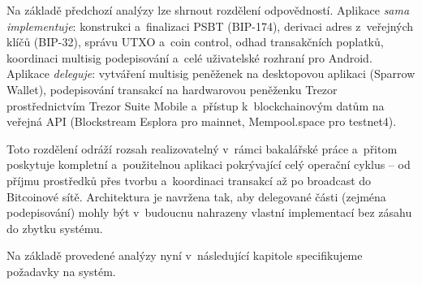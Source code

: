 Na základě předchozí analýzy lze shrnout rozdělení odpovědností.
Aplikace \emph{sama implementuje}: konstrukci a~finalizaci PSBT
(BIP-174), derivaci adres z~veřejných klíčů (BIP-32), správu UTXO
a~coin control, odhad transakčních poplatků, koordinaci multisig
podepisování a~celé uživatelské rozhraní pro Android.
Aplikace \emph{deleguje}: vytváření multisig peněženek na desktopovou
aplikaci (Sparrow Wallet), podepisování transakcí na hardwarovou
peněženku Trezor prostřednictvím Trezor Suite Mobile a~přístup
k~blockchainovým datům na veřejná API (Blockstream Esplora
pro mainnet, Mempool.space pro testnet4).

Toto rozdělení odráží rozsah realizovatelný v~rámci bakalářské práce
a~přitom poskytuje kompletní a~použitelnou aplikaci pokrývající celý
operační cyklus -- od příjmu prostředků přes tvorbu a~koordinaci
transakcí až po broadcast do Bitcoinové sítě. Architektura je navržena
tak, aby delegované části (zejména podepisování) mohly být v~budoucnu
nahrazeny vlastní implementací bez zásahu do zbytku systému.

Na základě provedené analýzy nyní v~následující kapitole specifikujeme
požadavky na systém.
